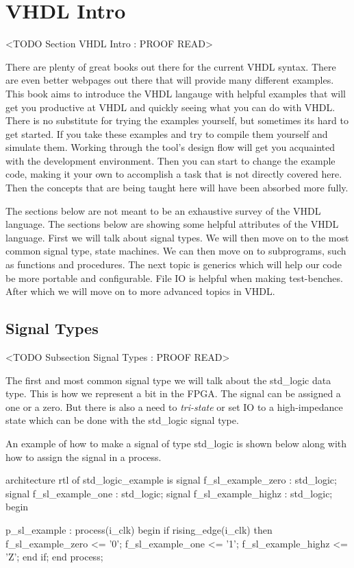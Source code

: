 \section{VHDL Intro}
	<TODO Section VHDL Intro : PROOF READ>
	
There are plenty of great books out there for the current \ac{VHDL} syntax. There are even better webpages out there that will provide many different examples. This book aims to introduce the \ac{VHDL} langauge with helpful examples that will get you productive at \ac{VHDL} and quickly seeing what you can do with \ac{VHDL}. There is no substitute for trying the examples yourself, but sometimes its hard to get started. If you take these examples and try to compile them yourself and simulate them. Working through the tool's design flow will get you acquainted with the development environment. Then you can start to change the example code, making it your own to accomplish a task that is not directly covered here. Then the concepts that are being taught here will have been absorbed more fully.

The sections below are not meant to be an exhaustive survey of the \ac{VHDL} language. The sections below are showing some helpful attributes of the \ac{VHDL} language. First we will talk about signal types. We will then move on to the most common signal type, state machines. We can then move on to subprograms, such as functions and procedures. The next topic is generics which will help our code be more portable and configurable. File \ac{IO} is helpful when making test-benches. After which we will move on to more advanced topics in \ac{VHDL}.

\subsection{Signal Types}
	<TODO Subsection Signal Types : PROOF READ>

The first and most common signal type we will talk about the std\_logic data type. This is how we represent a bit in the \ac{FPGA}. The signal can be assigned a one or a zero. But there is also a need to \emph{tri-state} or set \ac{IO} to a high-impedance state which can be done with the std\_logic signal type. 

An example of how to make a signal of type std\_logic is shown below along with how to assign the signal in a process.

\begin{VHDLlisting}[tabsize=4]
architecture rtl of std_logic_example is
	signal f_sl_example_zero     : std_logic;
	signal f_sl_example_one      : std_logic;
	signal f_sl_example_highz    : std_logic;
begin

p_sl_example : process(i_clk)
begin
	if rising_edge(i_clk) then
		f_sl_example_zero  <= '0';
		f_sl_example_one   <= '1';
		f_sl_example_highz <= 'Z';
	end if;
end process;
\end{VHDLlisting}

